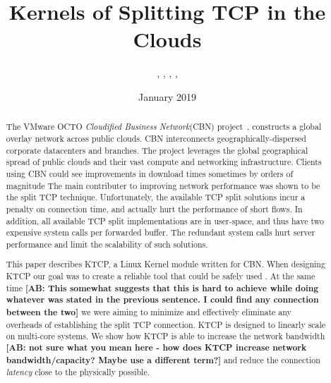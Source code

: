 \documentclass[newfonts=false,format=sigconf,9pt,letterpaper]{acmart}
\title{Kernels of Splitting TCP in the Clouds}
\author{\aut{Markuze Alex}{1,2}, \aut{Bergman Aran}{1}, \aut{Dar Chen}{1}, \aut{Issac Keslassy}{2},
        \aut{Israel Cidon}{1,2}}
\affiliation{%
  \institution{$^1$VMware Research\quad}
  \institution{$^2$Technion\quad}
}
\date{January 2019}
\newcommand{\oursys}{KTCP\xspace}
\newcommand{\mycomm}[3]{{\footnotesize{{\color{#2} \textbf{[#1: #3]}}}}}
\newcommand{\IK}[1]{\mycomm{IK}{blue}{#1}}
\newcommand{\AB}[1]{\mycomm{AB}{darkgreen}{#1}}
\begin{document}
\begin{abstract}
The VMware OCTO \emph{Cloudified Business Network}(CBN) project~\cite{Elastic, CDD}, 
constructs a global overlay network across public clouds. CBN interconnects geographically-dispersed corporate datacenters and branches. The project leverages the global geographical spread of public clouds and their vast compute and networking infrastructure.
Clients using CBN could see improvements in download times sometimes by orders of magnitude
The main contributer to improving network performance was shown to be the split TCP technique. 
Unfortunately, the available TCP split solutions incur a penalty on connection time, and actually hurt the performance of short flows. In addition, all available TCP split implementations are in user-space, and thus have two expensive system calls per forwarded buffer. The redundant system calls hurt server performance and limit the scalability of such solutions.

This paper describes \oursys, a Linux Kernel module written for CBN. 
When designing \oursys our goal was to create a reliable tool that could be safely used . At the same time
\AB{This somewhat suggests that this is hard to achieve while doing whatever was stated in the previous sentence. I could find any connection between the two} 
we were aiming to  minimize and effectively eliminate any overheads of establishing the split TCP connection. \oursys is designed to linearly scale on multi-core systems. We show how \oursys is able to increase the network bandwidth
\AB{not sure what you mean here - how does KTCP increase network bandwidth/capacity? Maybe use a different term?} 
and reduce the connection \emph{latency} close to the physically possible.


\end{abstract}
\end{document}
